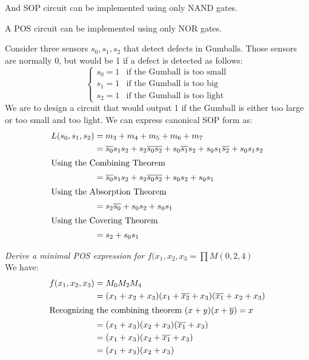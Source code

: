 \documentclass[11pt]{report}
\begin{document}
\begin{theorem}
    And SOP circuit can be implemented using only NAND gates.
\end{theorem}

\begin{theorem}
    A POS circuit can be implemented using only NOR gates.
\end{theorem}

\begin{example}
    Consider three sensors $s_0, s_1, s_2$ that detect defects in Gumballs. Those sensors are normally 0, but would be 1 if a defect is detected as follows:
    $$
        \begin{cases}
            s_0 = 1 & \text{if the Gumball is too small} \\
            s_1 = 1 & \text{if the Gumball is too big} \\
            s_2 = 1 & \text{if the Gumball is too light}
        \end{cases}
    $$
    We are to design a circuit that would output 1 if the Gumball is either too large or too small and too light. We can express canonical SOP form as:
    \begin{align*}
        L(s_0, s_1, s_2) &= m_3 + m_4 + m_5 + m_6 + m_7 \\ 
        &= \overline{s_0}s_1s_2 + s_2\overline{s_0}\overline{s_2} + s_0\overline{s_1}s_2 + s_0s_1\overline{s_2} + s_0s_1s_2 \\
        \intertext{Using the Combining Theorem}
        &= \overline{s_0}s_1s_2 + s_2\overline{s_0}\overline{s_2} + s_0s_2 + s_0s_1 \\
        \intertext{Using the Absorption Theorem}
        &= s_2\overline{s_0} + s_0s_2 + s_0s_1 \\
        \intertext{Using the Covering Theorem}
        &= s_2 + s_0s_1 
    \end{align*}
\end{example}

\begin{example}
    \textit{Derive a minimal POS expression for $f(x_1, x_2, x_3 = \prod M(0, 2, 4)$}
    \\
    We have:
    \begin{align*}
        f(x_1, x_2, x_3) &= M_0 M_2 M_4 \\
        &= (x_1 + x_2 + x_3)(x_1 + \overline{x_2} + x_3)(\overline{x_1} + x_2 + x_3) \\
    \intertext{Recognizing the combining theorem $(x+y)(x+\overline{y}) = x$}
        &= (x_1 + x_3)(x_2 + x_3)(\overline{x_1} + x_3) \\
        &= (x_1 + x_3)(x_2 + \overline{x_1} + x_3) \\
        &= (x_1 + x_3)(x_2 + x_3)
    \end{align*}   
\end{example}
\end{document}
